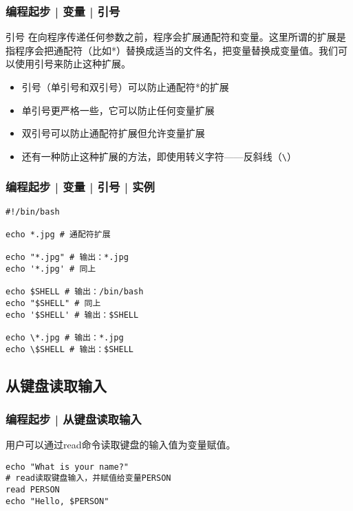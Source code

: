 \begin{frame}[fragile]
  \frametitle{编程起步 | 变量 | \alert{引号}}
  \begin{block}{引号}
    在向程序传递任何参数之前，程序会扩展通配符和变量。这里所谓的扩展是指程序会把通配符（比如*）替换成适当的文件名，把变量替换成变量值。我们可以使用引号来防止这种扩展。
    \begin{itemize}
      \item 引号（单引号和双引号）可以防止通配符*的扩展 
      \item 单引号更严格一些，它可以防止任何变量扩展
      \item 双引号可以防止通配符扩展但允许变量扩展
      \item 还有一种防止这种扩展的方法，即使用转义字符——反斜线（\verb|\|）
    \end{itemize}
  \end{block}
\end{frame}

\begin{frame}[fragile]
  \frametitle{编程起步 | 变量 | 引号 | \alert{实例}}
\begin{lstlisting}
#!/bin/bash

echo *.jpg # 通配符扩展

echo "*.jpg" # 输出：*.jpg
echo '*.jpg' # 同上

echo $SHELL # 输出：/bin/bash
echo "$SHELL" # 同上
echo '$SHELL' # 输出：$SHELL

echo \*.jpg # 输出：*.jpg
echo \$SHELL # 输出：$SHELL
\end{lstlisting}
\end{frame}


\subsection{从键盘读取输入}
\begin{frame}[fragile]
  \frametitle{编程起步 | 从键盘读取输入}
  用户可以通过\alert{read}命令读取键盘的输入值为变量赋值。
\begin{lstlisting}
echo "What is your name?"
# read读取键盘输入，并赋值给变量PERSON
read PERSON
echo "Hello, $PERSON"
\end{lstlisting}
\end{frame}

